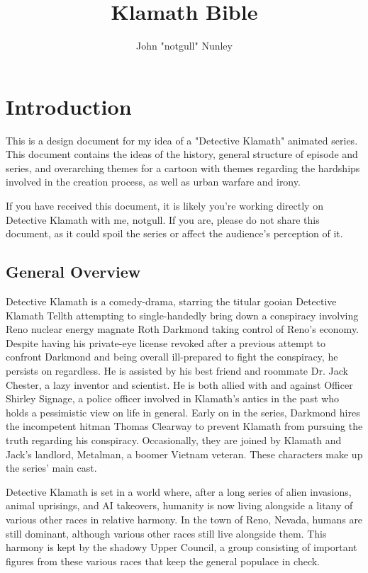 \documentclass{article}
\title{Klamath Bible}
\author{John "notgull" Nunley}
\begin{document}
\maketitle
\tableofcontents

\setlength{\parindent}{4em}
\setlength{\parskip}{1em}

\section{Introduction} 
This is a design document for my idea of a "Detective Klamath" animated series. This document contains the ideas of the history, general structure of episode and series, and overarching themes for a cartoon with themes regarding the hardships involved in the creation process, as well as urban warfare and irony.

If you have received this document, it is likely you're working directly on Detective Klamath with me, notgull. If you are, please do not share this document, as it could spoil the series or affect the audience's perception of it.

\subsection{General Overview}

Detective Klamath is a comedy-drama, starring the titular gooian Detective Klamath Tellth attempting to single-handedly bring down a conspiracy involving Reno nuclear energy magnate Roth Darkmond taking control of Reno's economy. Despite having his private-eye license revoked after a previous attempt to confront Darkmond and being overall ill-prepared to fight the conspiracy, he persists on regardless. He is assisted by his best friend and roommate Dr. Jack Chester, a lazy inventor and scientist. He is both allied with and against Officer Shirley Signage, a police officer involved in Klamath's antics in the past who holds a pessimistic view on life in general. Early on in the series, Darkmond hires the incompetent hitman Thomas Clearway to prevent Klamath from pursuing the truth regarding his conspiracy. Occasionally, they are joined by Klamath and Jack's landlord, Metalman, a boomer Vietnam veteran. These characters make up the series' main cast.

Detective Klamath is set in a world where, after a long series of alien invasions, animal uprisings, and AI takeovers, humanity is now living alongside a litany of various other races in relative harmony. In the town of Reno, Nevada, humans are still dominant, although various other races still live alongside them. This harmony is kept by the shadowy Upper Council, a group consisting of important figures from these various races that keep the general populace in check.
\end{document}
